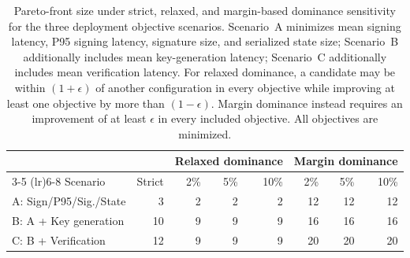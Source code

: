 \begin{table}[t]
\centering
\caption{Pareto-front size under strict, relaxed, and margin-based
dominance sensitivity for the three deployment objective scenarios.
Scenario~A minimizes mean signing latency, P95 signing latency,
signature size, and serialized state size; Scenario~B additionally
includes mean key-generation latency; Scenario~C additionally includes
mean verification latency. For relaxed dominance, a candidate may be
within $(1+\epsilon)$ of another configuration in every objective while
improving at least one objective by more than $(1-\epsilon)$. Margin
dominance instead requires an improvement of at least $\epsilon$ in
every included objective. All objectives are minimized.}
\label{tab:pareto_robustness}
\footnotesize
\setlength{\tabcolsep}{3.2pt}
\begin{tabular}{@{}lrrrrrrr@{}}
\toprule
& & \multicolumn{3}{c}{Relaxed dominance}
& \multicolumn{3}{c}{Margin dominance} \\
\cmidrule(lr){3-5}
\cmidrule(lr){6-8}
Scenario
& Strict
& 2\% & 5\% & 10\%
& 2\% & 5\% & 10\% \\
\midrule
A: Sign/P95/Sig./State
& 3 & 2 & 2 & 2 & 12 & 12 & 12 \\
B: A + Key generation
& 10 & 9 & 9 & 9 & 16 & 16 & 16 \\
C: B + Verification
& 12 & 9 & 9 & 9 & 20 & 20 & 20 \\
\bottomrule
\end{tabular}
\end{table}
